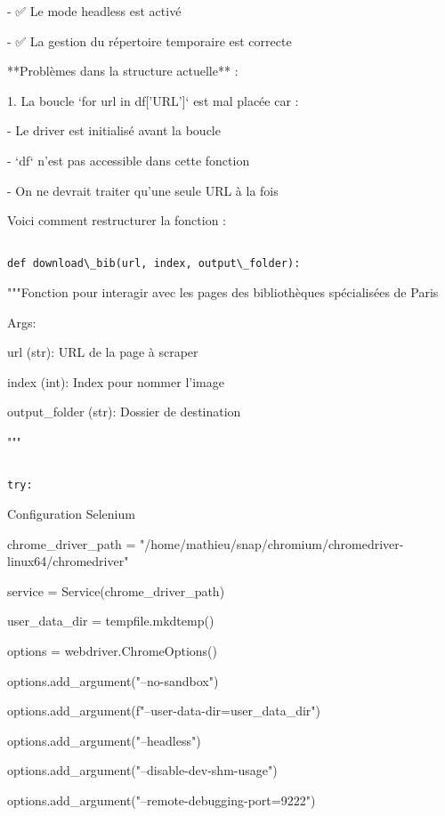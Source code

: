 - ✅ Le mode headless est activé

- ✅ La gestion du répertoire temporaire est correcte

**Problèmes dans la structure actuelle** :

1. La boucle `for url in df['URL']` est mal placée car :

- Le driver est initialisé avant la boucle

- `df` n'est pas accessible dans cette fonction

- On ne devrait traiter qu'une seule URL à la fois

Voici comment restructurer la fonction :

\begin{verbatim}

def download\_bib(url, index, output\_folder):

\end{verbatim}

"""Fonction pour interagir avec les pages des bibliothèques spécialisées de Paris

Args:

url (str): URL de la page à scraper

index (int): Index pour nommer l'image

output\_folder (str): Dossier de destination

"""

\begin{verbatim}

try:

\end{verbatim}

  Configuration Selenium

chrome\_driver\_path = "/home/mathieu/snap/chromium/chromedriver-linux64/chromedriver"

service = Service(chrome\_driver\_path)

user\_data\_dir = tempfile.mkdtemp()

options = webdriver.ChromeOptions()

options.add\_argument("--no-sandbox")

options.add\_argument(f"--user-data-dir={user\_data\_dir}")

options.add\_argument("--headless")

options.add\_argument("--disable-dev-shm-usage")

options.add\_argument("--remote-debugging-port=9222")

